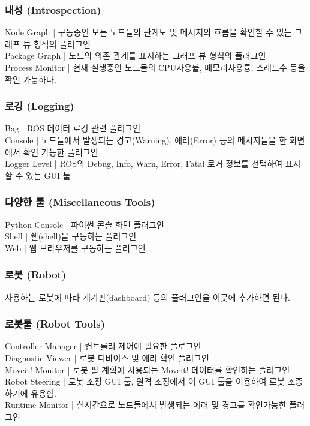 \subsubsection{내성 (Introspection)}
Node Graph | 구동중인 모든 노드들의 관계도 및 메시지의 흐름을 확인할 수 있는 그래프 뷰 형식의 플러그인\\
Package Graph | 노드의 의존 관계를 표시하는 그래프 뷰 형식의 플러그인\\
Process Monitor | 현재 실행중인 노드들의 CPU사용률, 메모리사용륭, 스레드수 등을 확인 가능하다.\\
\subsubsection{로깅 (Logging)}
Bag | ROS 데이터 로깅 관련 플러그인\\
Console | 노드들에서 발생되는 경고(Warning), 에러(Error) 등의 메시지들을 한 화면에서 확인 가능한 플러그인\\
Logger Level | ROS의 Debug, Info, Warn, Error, Fatal 로거 정보를 선택하여 표시할 수 있는 GUI 툴\\
\subsubsection{다양한 툴 (Miscellaneous Tools)}
Python Console | 파이썬 콘솔 화면 플러그인\\
Shell | 쉘(shell)을 구동하는 플러그인\\
Web | 웹 브라우저를 구동하는 플러그인\\
\subsubsection{로봇 (Robot)}
사용하는 로봇에 따라 계기판(dashboard) 등의 플러그인을 이곳에 추가하면 된다. \\
\subsubsection{로봇툴 (Robot Tools)}
Controller Manager | 컨트롤러 제어에 필요한 플로그인\\
Diagnostic Viewer | 로봇 디바이스 및 에러 확인 플러그인\\
Moveit! Monitor | 로봇 팔 계획에 사용되는 Moveit! 데이터를 확인하는 플러그인\\
Robot Steering | 로봇 조정 GUI 툴, 원격 조정에서 이 GUI 툴을 이용하여 로봇 조종하기에 유용함.\\
Runtime Monitor | 실시간으로 노드들에서 발생되는 에러 및 경고를 확인가능한 플러그인\\
